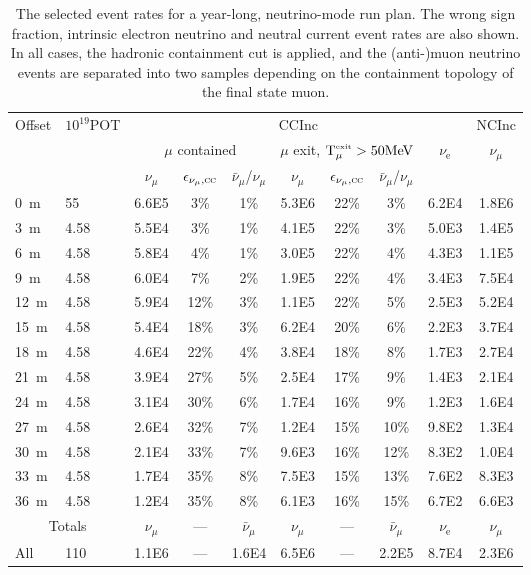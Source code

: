 

\begin{table}
\begin{tabular}{ l l || c c | c || c c | c | c || c }
\multirow{3}{*}{Offset} & \multirow{3}{*}{$10^{19}$POT} & \multicolumn{7}{c||}{CCInc} & NCInc \\
\cline{3-10}
& & \multicolumn{3}{c||}{$\mu$ contained} & \multicolumn{3}{c|}{$\mu$ exit, $\textrm{T}_{\mu}^\textrm{\tiny exit} > 50 \textrm{MeV}$} & \multirow{2}{*}{$\nu_\textrm{e}$} & \multirow{2}{*}{$\nu_{\mu}$} \\
& & $\nu_{\mu}$ & $\epsilon_{\nu_{\mu},\textsc{cc}}$ & $\bar{\nu}_{\mu}$/$\nu_{\mu}$ & $\nu_{\mu}$ & $\epsilon_{\nu_{\mu},\textsc{cc}}$ & $\bar{\nu}_{\mu}$/$\nu_{\mu}$ & & \\ \hline
 0~m  &  55  & 6.6E5 & 3\% & 1\% & 5.3E6 & 22\% & 3\% & 6.2E4 & 1.8E6 \\
 3~m  &  4.58  & 5.5E4 & 3\% & 1\% & 4.1E5 & 22\% & 3\% & 5.0E3 & 1.4E5  \\
 6~m  &  4.58  & 5.8E4 & 4\% & 1\% & 3.0E5 & 22\% & 4\% & 4.3E3 & 1.1E5 \\
 9~m  &  4.58  & 6.0E4 & 7\% & 2\% & 1.9E5 & 22\% & 4\% & 3.4E3 & 7.5E4 \\
 12~m  &  4.58  & 5.9E4 & 12\% & 3\% & 1.1E5 & 22\% & 5\% & 2.5E3 & 5.2E4 \\
 15~m  &  4.58  & 5.4E4 & 18\% & 3\% & 6.2E4 & 20\% & 6\% & 2.2E3 & 3.7E4 \\
 18~m  &  4.58  & 4.6E4 & 22\% & 4\% & 3.8E4 & 18\% & 8\% & 1.7E3 & 2.7E4 \\
 21~m  &  4.58  & 3.9E4 & 27\% & 5\% & 2.5E4 & 17\% & 9\% & 1.4E3 & 2.1E4 \\
 24~m  &  4.58  & 3.1E4 & 30\% & 6\% & 1.7E4 & 16\% & 9\% & 1.2E3 & 1.6E4 \\
 27~m  &  4.58  & 2.6E4 & 32\% & 7\% & 1.2E4 & 15\% & 10\% & 9.8E2 & 1.3E4 \\
 30~m  &  4.58  & 2.1E4 & 33\% & 7\% & 9.6E3 & 16\% & 12\% & 8.3E2 & 1.0E4 \\
 33~m  &  4.58  & 1.7E4 & 35\% & 8\% & 7.5E3 & 15\% & 13\% & 7.6E2 & 8.3E3 \\
 36~m  &  4.58  & 1.2E4 & 35\% & 8\% & 6.1E3 & 16\% & 15\% & 6.7E2 & 6.6E3 \\
\hline
\hline
\multicolumn{2}{c||}{Totals} & $\nu_{\mu}$ & --- & $\bar{\nu}_{\mu}$ & $\nu_{\mu}$ & --- & $\bar{\nu}_{\mu}$ & $\nu_\textrm{e}$ & $\nu_{\mu}$ \\ \hline
 All  &  110  & 1.1E6 & --- & 1.6E4 & 6.5E6 & --- & 2.2E5 & 8.7E4 & 2.3E6 \\
\end{tabular}

\caption{The selected event rates for a year-long, neutrino-mode run plan. The wrong sign fraction, intrinsic electron neutrino and neutral current event rates are also shown. In all cases, the hadronic containment cut is applied, and the (anti-)muon neutrino events are separated into two samples depending on the containment topology of the final state muon.}
\label{table:evrates_LAR}
\end{table}

